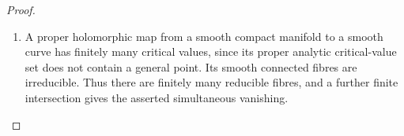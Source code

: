 \begin{proof}
\begin{enumerate}[label=\arabic*.,leftmargin=*]
\item A proper holomorphic map from a smooth compact manifold to a smooth curve has finitely many critical values, since its proper analytic critical-value set does not contain a general point. Its smooth connected fibres are irreducible. Thus there are finitely many reducible fibres, and a further finite intersection gives the asserted simultaneous vanishing.

\end{enumerate}
\end{proof}